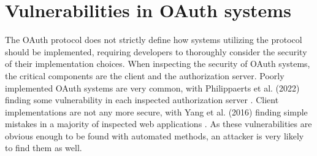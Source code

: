 \clearpage

\section{Vulnerabilities in OAuth systems}
\label{sec:vulnerabilities}

The OAuth protocol does not strictly define how systems utilizing the protocol should be implemented, requiring developers to thoroughly consider the security of their implementation choices.
When inspecting the security of OAuth systems, the critical components are the client and the authorization server.
Poorly implemented OAuth systems are very common, with Philippaerts et al. (2022) finding some vulnerability in each inspected authorization server \citep{philippaerts_oauch_2022}.
Client implementations are not any more secure, with Yang et al. (2016) finding simple mistakes in a majority of inspected web applications \citep{yang_model-based_2016}.
As these vulnerabilities are obvious enough to be found with automated methods, an attacker is very likely to find them as well.




